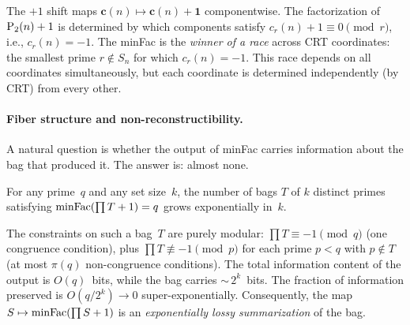 The $+1$ shift maps $\mathbf{c}(n) \mapsto \mathbf{c}(n) + \mathbf{1}$
componentwise.  The factorization of $\mathrm{P}_{2}(n)+1$ is determined by which
components satisfy $c_r(n) + 1 \equiv 0 \pmod{r}$, i.e., $c_r(n) = -1$.
The minFac is the \emph{winner of a race} across CRT coordinates: the
smallest prime $r \notin S_n$ for which $c_r(n) = -1$.  This race
depends on all coordinates simultaneously, but each coordinate is
determined independently (by CRT) from every other.

\paragraph{Fiber structure and non-reconstructibility.}
A natural question is whether the output of minFac carries information
about the bag that produced it.  The answer is: almost none.

\begin{proposition}
For any prime~$q$ and any set size~$k$, the number of bags $T$ of $k$
distinct primes satisfying $\mathrm{minFac}(\prod T + 1) = q$ grows
exponentially in~$k$.
\end{proposition}

The constraints on such a bag~$T$ are purely modular:
$\prod T \equiv -1 \pmod{q}$ (one congruence condition), plus
$\prod T \not\equiv -1 \pmod{p}$ for each prime $p < q$ with
$p \notin T$ (at most $\pi(q)$ non-congruence conditions).  The total
information content of the output is $O(q)$~bits, while the bag carries
${\sim}\, 2^k$~bits.  The fraction of information preserved is
$O(q / 2^k) \to 0$ super-exponentially.  Consequently, the map
$S \mapsto \mathrm{minFac}(\prod S + 1)$ is an \emph{exponentially lossy
summarization} of the bag.

